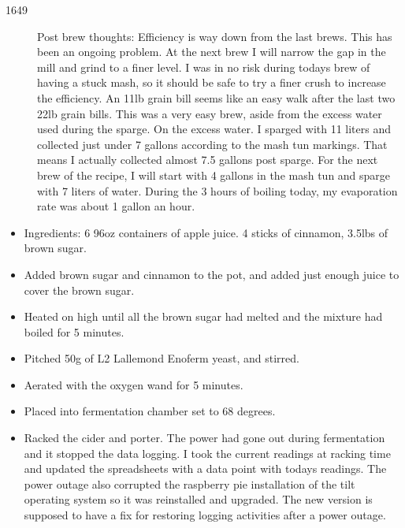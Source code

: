 \begin{description}
    \item[1649] Post brew thoughts:  Efficiency is way down from the last brews.  This has been an ongoing problem.  At the next brew I will narrow the gap in the mill and grind to a finer level.  I was in no risk during todays brew of having a stuck mash, so it should be safe to try a finer crush to increase the efficiency.  An 11lb grain bill seems like an easy walk after the last two 22lb grain bills.  This was a very easy brew, aside from the excess water used during the sparge.  On the excess water.  I sparged with 11 liters and collected just under 7 gallons according to the mash tun markings.  That means I actually collected almost 7.5 gallons post sparge.  For the next brew of the recipe, I will start with 4 gallons in the mash tun and sparge with 7 liters of water.  During the 3 hours of boiling today, my evaporation rate was about 1 gallon an hour.
\end{description}

\def\todaysdate{20200212}
\newday{\todaysdate}\label{\todaysdate}

\begin{itemize}
    \item Ingredients: 6 96oz containers of apple juice.  4 sticks of cinnamon, 3.5lbs of brown sugar.
    \item Added brown sugar and cinnamon to the pot, and added just enough juice to cover the brown sugar.
    \item Heated on high until all the brown sugar had melted and the mixture had boiled for 5 minutes.
    \item Pitched 50g of L2 Lallemond Enoferm yeast, and stirred.
    \item Aerated with the oxygen wand for 5 minutes.
    \item Placed into fermentation chamber set to 68 degrees.
\end{itemize}

\def\todaysdate{20200228}
\newday{\todaysdate}\label{\todaysdate}

\begin{itemize}
    \item Racked the cider and porter.  The power had gone out during fermentation and it stopped the data logging.  I took the current readings at racking time and updated the spreadsheets with a data point with todays readings.  The power outage also corrupted the raspberry pie installation of the tilt operating system so it was reinstalled and upgraded.  The new version is supposed to have a fix for restoring logging activities after a power outage.
\end{itemize}

